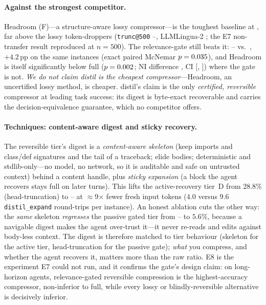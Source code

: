 \documentclass[11pt]{article}
\newcommand{\sweEeightN}{500}\newcommand{\sweEeightSeed}{1729}%
\newcommand{\sweEeightDistilPass}{--}\newcommand{\sweEeightDistilResolved}{--}%
\newcommand{\sweEeightExpandPass}{--}\newcommand{\sweEeightExpandResolved}{--}%
\newcommand{\sweEeightGatedPass}{--}\newcommand{\sweEeightGatedResolved}{--}%
\begin{document}
\paragraph{Against the strongest competitor.} Headroom (F)---a structure-aware lossy
compressor---is the toughest baseline at \sweEeightHeadroomPass{}, far above the lossy
token-droppers (\texttt{trunc@500} \sweEeightDistilPass{}, LLMLingua-2 \sweEeightLinguaPass{};
the E7 non-transfer result reproduced at $n=\sweEeightN{}$). The relevance-gate still beats
it: \sweEeightGatedPass{} vs.\ \sweEeightHeadroomPass{}, $+4.2$\,pp on the same instances
(exact paired McNemar $p=0.035{}$), and Headroom is itself significantly
below full ($p=0.002{}$; NI difference \sweEeightHeadroomNIDelta{}, CI
[\sweEeightHeadroomNICIlo, \sweEeightHeadroomNICIhi]) where the gate is not. \emph{We do not
claim distil is the cheapest compressor}---Headroom, an uncertified lossy method, is cheaper.
distil's claim is the only \emph{certified, reversible} compressor at leading task success:
its digest is byte-exact recoverable and carries the decision-equivalence guarantee, which
no competitor offers.

\paragraph{Techniques: content-aware digest and sticky recovery.} The reversible tier's
digest is a \emph{content-aware skeleton} (keep imports and class/def signatures and the
tail of a traceback; elide bodies; deterministic and stdlib-only---no model, no network, so
it is auditable and safe on untrusted context) behind a content handle, plus \emph{sticky
expansion} (a block the agent recovers stays full on later turns). This lifts the
active-recovery tier~D from $28.8\%$ (head-truncation) to \sweEeightExpandPass{} at
$\approx$9$\times$ fewer fresh input tokens ($4.0$ versus $9.6$ \texttt{distil\_expand}
round-trips per instance). An honest ablation cuts the other way: the \emph{same} skeleton
\emph{regresses} the passive gated tier from \sweEeightGatedPass{} to $5.6\%$, because a
navigable digest makes the agent over-trust it---it never re-reads and edits against
body-less context. The digest is therefore matched to tier behaviour (skeleton for the
active tier, head-truncation for the passive gate); \emph{what} you compress, and whether the
agent recovers it, matters more than the raw ratio. E8 is the experiment E7 could not run,
and it confirms the gate's design claim: on long-horizon agents, relevance-gated reversible
compression is the highest-accuracy compressor, non-inferior to full, while every lossy or
blindly-reversible alternative is decisively inferior.
\end{document}
